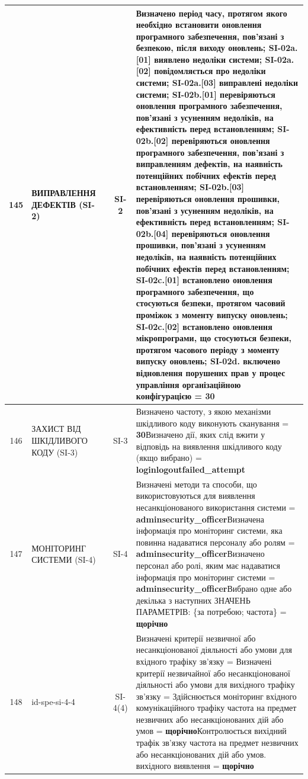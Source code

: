 \documentclass[10pt]{article}
\begin{document}
\begin{longtable}{|c|>{\raggedright\arraybackslash}p{2.5cm}|>{\raggedright\arraybackslash}p{4.5cm}|c|>{\raggedright\arraybackslash}p{4.5cm}|}
145 & ВИПРАВЛЕННЯ ДЕФЕКТІВ (SI-2) &  & SI-2 & Визначено період часу, протягом якого необхідно встановити оновлення програмного забезпечення, пов'язані з безпекою, після виходу оновлень; SI-02a.[01] виявлено недоліки системи; SI-02a.[02] повідомляється про недоліки системи; SI-02a.[03] виправлені недоліки системи; SI-02b.[01] перевіряються оновлення програмного забезпечення, пов'язані з усуненням недоліків, на ефективність перед встановленням; SI-02b.[02] перевіряються оновлення програмного забезпечення, пов'язані з виправленням дефектів, на наявність потенційних побічних ефектів перед встановленням; SI-02b.[03] перевіряються оновлення прошивки, пов'язані з усуненням недоліків, на ефективність перед встановленням; SI-02b.[04] перевіряються оновлення прошивки, пов'язані з усуненням недоліків, на наявність потенційних побічних ефектів перед встановленням; SI-02c.[01] встановлено оновлення програмного забезпечення, що стосуються безпеки, протягом часовий проміжок з моменту випуску оновлень; SI-02c.[02] встановлено оновлення мікропрограми, що стосуються безпеки, протягом часового періоду з моменту випуску оновлень; SI-02d. включено відновлення порушених прав у процес управління організаційною конфігурацією = \textbf{30} \\ \hline
146 & ЗАХИСТ ВІД ШКІДЛИВОГО КОДУ (SI-3) &  & SI-3 & Визначено частоту, з якою механізми шкідливого коду виконують сканування = \textbf{30}\newline Визначено дії, яких слід вжити у відповідь на виявлення шкідливого коду (якщо вибрано) = \textbf{loginlogoutfailed\_\allowbreak{}attempt} \\ \hline
147 & МОНІТОРИНГ СИСТЕМИ (SI-4) &  & SI-4 & Визначені методи та способи, що використовуються для виявлення несанкціонованого використання системи = \textbf{adminsecurity\_\allowbreak{}officer}\newline Визначена інформація про моніторинг системи, яка повинна надаватися персоналу або ролям = \textbf{adminsecurity\_\allowbreak{}officer}\newline Визначено персонал або ролі, яким має надаватися інформація про моніторинг системи = \textbf{adminsecurity\_\allowbreak{}officer}\newline Вибрано одне або декілька з наступних ЗНАЧЕНЬ ПАРАМЕТРІВ: \{за потребою; частота\} = \textbf{щорічно} \\ \hline
148 & id-spe-si-4-4 &  & SI-4(4) & Визначені критерії незвичної або несанкціонованої діяльності або умови для вхідного трафіку зв'язку = \textbf{}\newline Визначені критерії незвичайної або несанкціонованої діяльності або умови для вихідного трафіку зв'язку = \textbf{}\newline Здійснюється моніторинг вхідного комунікаційного трафіку частота на предмет незвичних або несанкціонованих дій або умов = \textbf{щорічно}\newline Контролюється вихідний трафік зв'язку частота на предмет незвичних або несанкціонованих дій або умов. вихідного виявлення = \textbf{щорічно} \\ \hline

\end{longtable}
\end{document}
